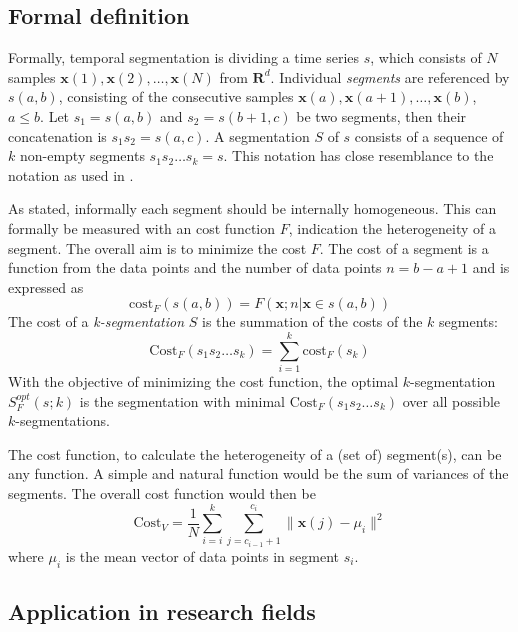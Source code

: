 \subsection{Formal definition}
Formally, temporal segmentation is dividing a time series $s$, which consists 
of $N$ samples $\mathbf{x}(1),\mathbf{x}(2),\dots,\mathbf{x}(N)$ from 
$\mathbf{R}^d$. Individual \emph{segments} are referenced by $s(a,b)$, 
consisting of the consecutive samples 
$\mathbf{x}(a),\mathbf{x}(a+1),\dots,\mathbf{x}(b)$, $a \le b$. Let $s_1 = 
s(a,b)$ and $s_2 = s(b+1,c)$ be two segments, then their concatenation is 
$s_1s_2 = s(a,c)$. A segmentation $S$ of $s$ consists of a sequence of $k$ 
non-empty segments $s_1s_2 \dots s_k = s$.
This notation has close resemblance to the notation as used in 
\cite{himberg2001time}.

As stated, informally each segment should be internally homogeneous. This can 
formally be measured with an cost function $F$, indication the heterogeneity 
of a segment. The overall aim is to minimize the cost $F$. The cost of a 
segment is a function from the data points and the number of data points $n = 
b - a + 1$ and is expressed as
\begin{equation} \label{eq:segment_cost}
\mathrm{cost}_F (s(a,b)) = F(\mathbf{x};n|\mathbf{x} \in s(a,b))
\end{equation}
The cost of a \emph{k-segmentation} $S$ is the summation of the costs of the 
$k$ segments:
\begin{equation} \label{eq:segmentation_cost}
\mathrm{Cost}_F (s_1 s_2 \dots s_k) = \sum_{i=1}^{k} \mathrm{cost}_F (s_k)
\end{equation}
With the objective of minimizing the cost function, the optimal 
$k$-segmentation $S_F^\mathit{opt}(s;k)$ is the segmentation with minimal 
$\mathrm{Cost}_F(s_1 s_2 \dots s_k)$ over all possible $k$-segmentations.

The cost function, to calculate the heterogeneity of a (set of) segment(s), 
can 
be any function. A simple and natural function would be the sum of variances 
of the segments. The overall cost function would then be
\begin{equation} \label{eq:cost_variances}
\mathrm{Cost}_V = \frac{1}{N} \sum_{i=i}^{k} \sum_{j=c_{i-1}+1}^{c_i} \| 
\mathbf{x}(j) - \mu_i \|^2
\end{equation} 
where $\mu_i$ is the mean vector of data points in segment $s_i$.

\subsection{Application in research fields}

